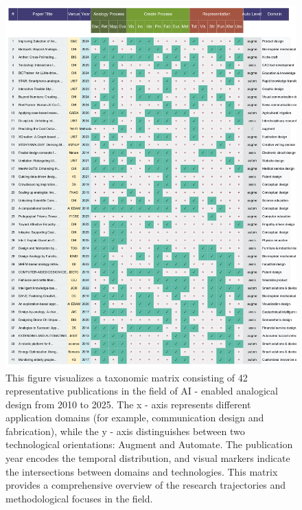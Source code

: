 

%
\begin{figure}
    \centering
    \includegraphics[width=1\linewidth]{Figures/complete_41_papers_presentation 2.png}
    \caption{This figure visualizes a taxonomic matrix consisting of 42 representative publications in the field of AI - enabled analogical design from 2010 to 2025. The x - axis represents different application domains (for example, communication design and fabrication), while the y - axis distinguishes between two technological orientations: Augment and Automate. The publication year encodes the temporal distribution, and visual markers indicate the intersections between domains and technologies. This matrix provides a comprehensive overview of the research trajectories and methodological focuses in the field.}
    \label{fig:enter-label}
\end{figure}














